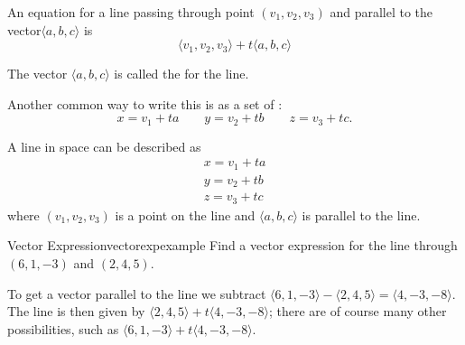 \begin{formulabox}
An equation for a line passing through point $(v_1, v_2, v_3)$ and parallel to the vector$\langle a, b, c\rangle$ is
\[
\langle v_1,v_2,v_3\rangle+t\langle a,b,c\rangle
\]
\end{formulabox}

The vector $\langle a, b, c\rangle$ is called the  for the line. 

Another
common way to write this is as a set of 
:
$$ x= v_1+ta\qquad y=v_2+tb \qquad z=v_3+tc.$$

\begin{formulabox}
A line in space can be described as 
\begin{align*}
x = v_1 + ta \\
y = v_2 + tb \\
z = v_3 + tc
\end{align*}
where $(v_1, v_2, v_3)$ is a point on the line and $\langle a, b, c \rangle$ is parallel to the line.
\end{formulabox}

\begin{example}{Vector Expression}{vectorexpexample}
Find a vector expression for the line through $(6,1,-3)$ and
$(2,4,5)$.
\end{example}
\begin{solution}
To get a vector parallel to the line we subtract $\langle
6,1,-3\rangle-\langle2,4,5\rangle=\langle 4,-3,-8\rangle$.  The line
is then given by $\langle 2,4,5\rangle+t\langle 4,-3,-8\rangle$; there
are of course many other possibilities, such as $\langle
6,1,-3\rangle+t\langle 4,-3,-8\rangle$.
\end{solution}

